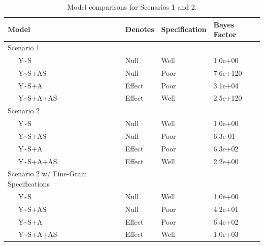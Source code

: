 \documentclass[
  english,
  ,man]{apa6}
\begin{document}
\begin{table}[tbp]

\begin{center}
\begin{threeparttable}

\caption{\label{tab:senTab}Model comparisons for Scenarios 1 and 2.}

\begin{tabular}{llll}
\toprule
Model & Denotes & Specification & Bayes Factor\\
\midrule
Scenario 1 &  &  & \\
\ \ \ Y\textasciitilde{}S & Null & Well & 1.0e+00\\
\ \ \ Y\textasciitilde{}S+AS & Null & Poor & 7.6e+120\\
\ \ \ Y\textasciitilde{}S+A & Effect & Poor & 3.1e+04\\
\ \ \ Y\textasciitilde{}S+A+AS & Effect & Well & 2.5e+120\\
Scenario 2 &  &  & \\
\ \ \ Y\textasciitilde{}S & Null & Well & 1.0e+00\\
\ \ \ Y\textasciitilde{}S+AS & Null & Poor & 6.3e-01\\
\ \ \ Y\textasciitilde{}S+A & Effect & Poor & 6.3e+02\\
\ \ \ Y\textasciitilde{}S+A+AS & Effect & Well & 2.2e+00\\
Scenario 2 w/ Fine-Grain Specifications &  &  & \\
\ \ \ Y\textasciitilde{}S & Null & Well & 1.0e+00\\
\ \ \ Y\textasciitilde{}S+AS & Null & Poor & 4.2e+01\\
\ \ \ Y\textasciitilde{}S+A & Effect & Poor & 6.4e+02\\
\ \ \ Y\textasciitilde{}S+A+AS & Effect & Well & 1.0e+03\\
\bottomrule
\end{tabular}

\end{threeparttable}
\end{center}

\end{table}
\end{document}
